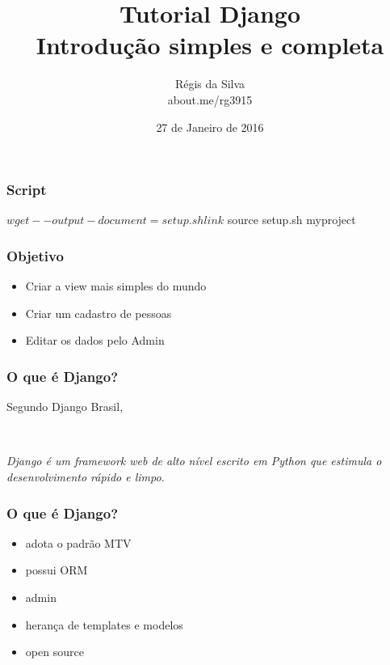 \documentclass[aspectratio=169]{beamer}
\title{Tutorial Django\\ Introdução simples e completa}
\author{R\'egis da Silva\\ {\texorpdfstring{\color{blue}}{ }about.me/rg3915}}
\institute{\url{github.com/grupy-sp/encontros}}
\date{27 de Janeiro de 2016}
\begin{document}
\justifying %

{%




\begin{frame}
	\titlepage
\end{frame}

\begin{frame}[fragile]\frametitle{Script}

\begin{bashcode}
$ wget --output-document=setup.sh link
$ source setup.sh myproject
\end{bashcode}

\end{frame}


\begin{frame}\frametitle{Objetivo}
	\begin{itemize}
        \item Criar a view mais simples do mundo
        \item Criar um cadastro de pessoas
        \item Editar os dados pelo Admin
	\end{itemize}
\end{frame}

\begin{frame}\frametitle{O que \'e Django?}

Segundo Django Brasil,

\

\begin{exampleblock}{}
    {\it Django \'e um framework web de alto n\'ivel escrito em Python que estimula o desenvolvimento r\'apido e limpo.}
\end{exampleblock}

\end{frame}

\begin{frame}\frametitle{O que \'e Django?}

\begin{itemize}[<+(1)->]
    \item adota o padr\~ao MTV
    \item possui ORM
    \item admin
    \item heran\c ca de templates e modelos
    \item open source
\end{itemize}


\end{frame}}
\end{document}
